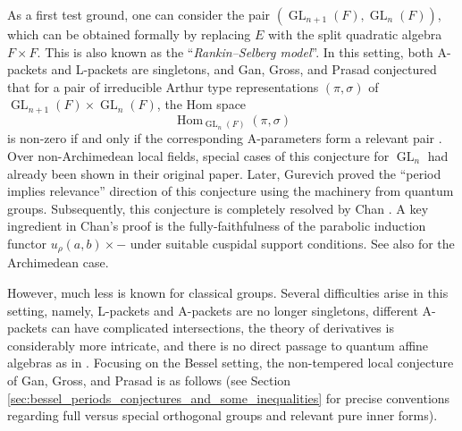 \documentclass[11pt,letterpaper]{amsart}
\theoremstyle{plain}
\numberwithin{theorem}{section}
\numberwithin{equation}{subsection}
\theoremstyle{remark}
\newcommand{\Hom}{\operatorname{Hom}}
\newcommand{\GL}{\operatorname{GL}}
\begin{document}
\vskip 5pt

As a first test ground, one can consider the pair $\left(\GL_{n+1}\left(F\right), \GL_n\left(F\right)\right)$, which can be obtained formally by replacing $E$ with the split quadratic algebra $F \times F$. This is also known as the ``\emph{Rankin--Selberg model}''. In this setting, both A-packets and L-packets are singletons, and Gan, Gross, and Prasad conjectured that for a pair of irreducible Arthur type representations $\left(\pi,\sigma\right)$ of $\GL_{n+1}\left(F\right)\times \GL_n\left(F\right)$, the Hom space 
\[
    \Hom_{\GL_n\left(F\right)}\left(\pi,\sigma\right)
\]
is non-zero if and only if the corresponding A-parameters form a relevant pair \cite[Conj. 5.1]{MR4190046}. Over non-Archimedean local fields, special cases of this conjecture for $\GL_n$ had already been shown in their original paper. Later, Gurevich \cite{Gur22} proved the ``period implies relevance'' direction of this conjecture using the machinery from quantum groups. Subsequently, this conjecture is completely resolved by Chan \cite{MR4373242}. A key ingredient in Chan's proof is the fully-faithfulness of the parabolic induction functor $u_\rho\left(a,b\right)\times-$ under suitable cuspidal support conditions. See also \cite{chenchenNTGGP4ArchiGL} for the Archimedean case.

\vskip 5pt

However, much less is known for classical groups. Several difficulties arise in this setting, namely, L-packets and A-packets are no longer singletons, different A-packets can have complicated intersections, the theory of derivatives is considerably more intricate, and there is no direct passage to quantum affine algebras as in \cite{Gur22, MR4373242}. Focusing on the Bessel setting, the non-tempered local conjecture of Gan, Gross, and Prasad is as follows (see Section \ref{sec:bessel_periods_conjectures_and_some_inequalities} for precise conventions regarding full versus special orthogonal groups and relevant pure inner forms).
\end{document}
